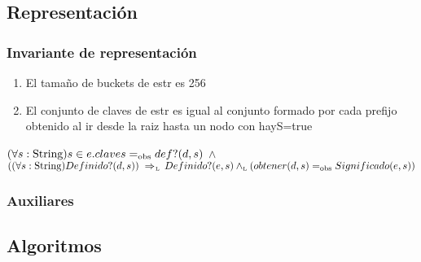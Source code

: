 \subsection{Representación}


\subsubsection*{Invariante de representación}

\begin{enumerate}
\item El tamaño de buckets de estr es 256
\item El conjunto de claves de estr es igual al conjunto formado por cada prefijo obtenido al ir desde la raiz hasta un nodo con hayS=true
\end{enumerate}

$(\paratodo{String}{s}) s \in e.claves \igobs def?(d,s)$ $\land$ \\
$((\paratodo{String}{s}) Definido?(d,s)) \impluego Definido?(e,s) \yluego (obtener(d,s) \igobs Significado(e,s))$

\subsubsection*{Auxiliares}




\subsection{Algoritmos}


